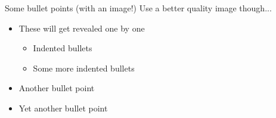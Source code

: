 \documentclass[aspectratio=169]{beamer}
\begin{document}
\begin{frame}[div=0.675\paperwidth]{Some bullet points (with an image!)}
  Use a better quality image though...
  \begin{itemize}[<+->]
  \item These will get revealed one by one
    \begin{itemize}
    \item Indented bullets
    \item Some more indented bullets
    \end{itemize}
  \item Another bullet point
  \item Yet another bullet point
  \end{itemize}
\end{frame}
\end{document}
